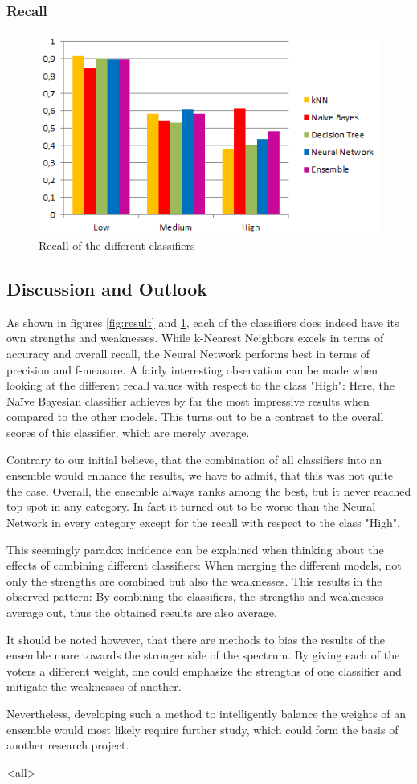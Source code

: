 \begin{frame}
	\frametitle{Recall}	
	\begin{figure}[h]
		\centering
		\includegraphics[width=0.8\columnwidth]{../../charts/recall.png}
		\caption{Recall of the different classifiers}
		\label{fig:recall}
	\end{figure}
\end{frame}


\subsection{Discussion and Outlook}

As shown in figures \ref{fig:result} and \ref{fig:recall}, each of the
classifiers does indeed have its own strengths and weaknesses.
While k-Nearest Neighbors excels in terms of accuracy and overall
recall, the Neural Network performs best in terms of precision and
f-measure. A fairly interesting observation can be made when looking
at the different recall values with respect to the class "High":
Here, the Na\"ive Bayesian classifier achieves by far the most impressive
results when compared to the other models. This turns out to be a
contrast to the overall scores of this classifier, which are merely average.

Contrary to our initial believe, that the combination of all
classifiers into an ensemble would enhance the results, we have to
admit, that this was not quite the case. Overall, the ensemble always
ranks among the best, but it never reached top spot in any
category. In fact it turned out to be worse than the Neural Network in
every category except for the recall with respect to the class "High".

This seemingly paradox incidence can be explained when
thinking about the effects of combining different classifiers: When
merging the different models, not only the strengths are combined but
also the weaknesses. This results in the observed pattern: By
combining the classifiers, the strengths and weaknesses average out,
thus the obtained results are also average.

It should be noted however, that there are methods to bias the results
of the ensemble more towards the stronger side of the spectrum.
By giving each of the voters a different weight, one could emphasize the
strengths of one classifier and mitigate the weaknesses of
another.

\noindent Nevertheless, developing such a method to intelligently balance the weights of an
ensemble would most likely require further study, which
could form the basis of another research project.

\mode<all>